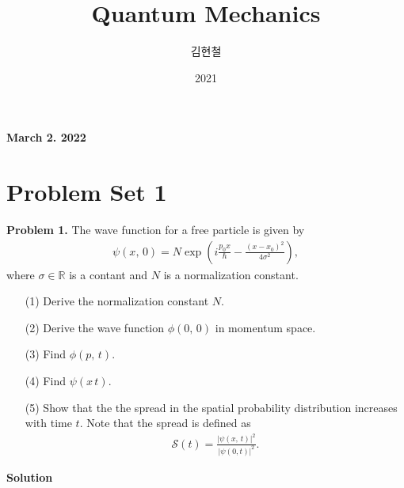 \documentclass[floatfix,nofootinbib,superscriptaddress,fleqn]{revtex4}
\begin{document}
\title{\Large Quantum Mechanics}
\author{김현철}
\date{2021}

\maketitle

 \textbf{\color{red} March 2. 2022} \\ 
\vspace{2cm}

\section*{\large Problem Set 1}
\noindent \textbf{Problem 1.}
The wave function for a free particle is given by
\begin{align*}
\psi(x,\,0) = N \exp\left( i\frac{p_0 x}{\hbar}  
-\frac{(x-x_0)^2}{4\sigma^2} \right),   
\end{align*}
where $\sigma \in \mathbb{R}$ is a contant and $N$ is a normalization
constant. 
\begin{itemize}
\item[(1)] Derive the normalization constant $N$.  
\item[(2)] Derive the wave function $\phi(0,\,0)$ in momentum space. 
\item[(3)] Find $\phi(p,\,t)$.
\item[(4)] Find $\psi(x\,t)$.
\item[(5)] Show that the the spread in the spatial probability
  distribution increases with time $t$. Note that the spread is
  defined as 
  \begin{align*}
\mathcal{S}(t) = \frac{|\psi(x,\,t)|^2}{|\psi(0,t)|^2}.    
  \end{align*}
\end{itemize}
\noindent \textbf{Solution}
\end{document}
